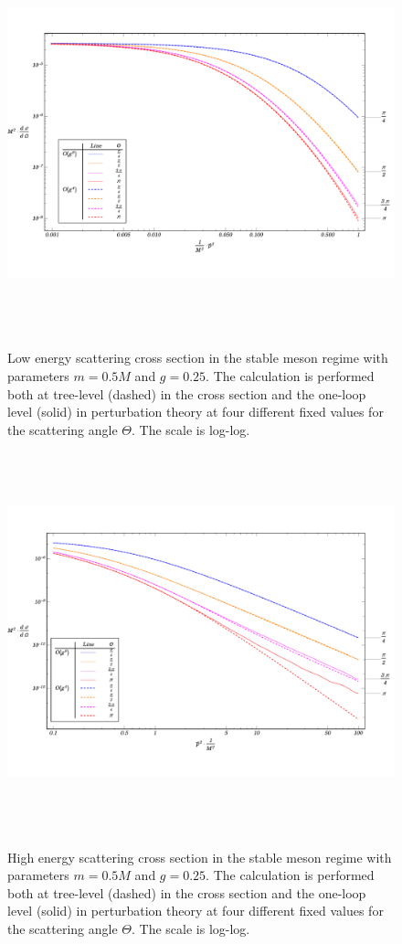 \documentclass{article}
\begin{document}
\begin{figure}
\begin{center}
\vspace*{-2cm}
\includegraphics[width=15cm, height=11cm]{StableMeson-LowEnergy}
\caption{Low energy scattering cross section in the stable meson regime with parameters $m = 0.5 M$ and $g = 0.25$. The calculation is performed both at tree-level (dashed) in the cross section and the one-loop level (solid) in perturbation theory at four different fixed values for the scattering angle $\Theta$. The scale is log-log.} 
\label{StabLowEnergy}
\includegraphics[width=15cm, height=11cm]{StableMeson-HighEnergy}
\caption{High energy scattering cross section in the stable meson regime with parameters $m = 0.5 M$ and $g = 0.25$. The calculation is performed both at tree-level (dashed) in the cross section and the one-loop level (solid) in perturbation theory at four different fixed values for the scattering angle $\Theta$. The scale is log-log.} 
\label{StabHighEnergy}
\end{center}
\end{figure} 
\end{document}

